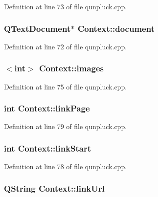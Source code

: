 Definition at line 73 of file qunpluck.\+cpp.

\hypertarget{classContext_a54035c81b3259aa6d9fb9d8385afc9d6}{
\subsubsection[{document}]{\setlength{\rightskip}{0pt plus 5cm}Q\+Text\+Document$\ast$ Context\+::document}}\label{classContext_a54035c81b3259aa6d9fb9d8385afc9d6}


Definition at line 72 of file qunpluck.\+cpp.

\hypertarget{classContext_afe982728eb8a877661685cac947386ba}{
\subsubsection[{images}]{$<$int$>$ Context\+::images}}\label{classContext_afe982728eb8a877661685cac947386ba}


Definition at line 75 of file qunpluck.\+cpp.

\hypertarget{classContext_ae18c8d60c78e06d96b0954bd72d35ef0}{
\subsubsection[{link\+Page}]{\setlength{\rightskip}{0pt plus 5cm}int Context\+::link\+Page}}\label{classContext_ae18c8d60c78e06d96b0954bd72d35ef0}


Definition at line 79 of file qunpluck.\+cpp.

\hypertarget{classContext_a7a0d307891ae75d44930ab89e43c3f38}{
\subsubsection[{link\+Start}]{\setlength{\rightskip}{0pt plus 5cm}int Context\+::link\+Start}}\label{classContext_a7a0d307891ae75d44930ab89e43c3f38}


Definition at line 78 of file qunpluck.\+cpp.

\hypertarget{classContext_a8648a7eed8ea2b2a5b2e6b637b78f331}{
\subsubsection[{link\+Url}]{\setlength{\rightskip}{0pt plus 5cm}Q\+String Context\+::link\+Url}}\label{classContext_a8648a7eed8ea2b2a5b2e6b637b78f331}


